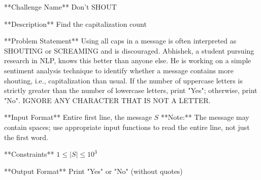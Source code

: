 **Challenge Name**  
Don't SHOUT

**Description**  
Find the capitalization count

**Problem Statement**  
Using all caps in a message is often interpreted as SHOUTING or SCREAMING and is discouraged. Abhishek, a student pursuing research in NLP, knows this better than anyone else. He is working on a simple sentiment analysis technique to identify whether a message contains more shouting, i.e., capitalization than usual. If the number of uppercase letters is strictly greater than the number of lowercase letters, print "Yes"; otherwise, print "No". IGNORE ANY CHARACTER THAT IS NOT A LETTER.

**Input Format**  
Entire first line, the message $S$  
**Note:** The message may contain spaces; use appropriate input functions to read the entire line, not just the first word.

**Constraints**  
$1 \leq |S| \leq 10^3$

**Output Format**  
Print "Yes" or "No" (without quotes)